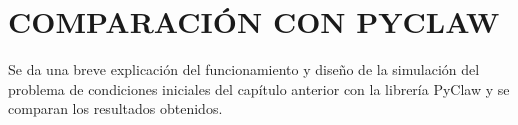 \chapter{COMPARACIÓN CON PYCLAW}
Se da una breve explicación del funcionamiento y diseño de la simulación del problema de condiciones iniciales del capítulo anterior con la librería PyClaw y se comparan los resultados obtenidos.